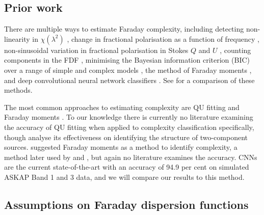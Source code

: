   \subsection{Prior work}
  \label{sec:faraday-prior-work}

      There are multiple ways to estimate Faraday complexity, including detecting non-\linebreak{}linearity in $\chi(\lambda^2)$ \citep{goldstein84faraday}, change in fractional polarisation as a function of frequency \citep{farnes14broadband}, non-sinusoidal variation in fractional polarisation in Stokes $Q$ and $U$ \citep{osullivan12agn}, counting components in the FDF \citep{law11faraday}, minimising the Bayesian information criterion (BIC) over a range of simple and complex models \citep[called ;][]{osullivan_broad-band_2017}, the method of Faraday moments \citep{anderson_broadband_2015,brown11report}, and deep convolutional neural network classifiers \citep[CNNs;][]{brown_classifying_2018}. See \citet{sun15comparison} for a comparison of these methods.

      The most common approaches to estimating complexity are QU fitting \linebreak\citep[e.g.][]{osullivan_broad-band_2017} and Faraday moments \citep[e.g.][]{anderson_broadband_2015}. To our knowledge there is currently no literature examining the accuracy of QU fitting when applied to complexity classification specifically, though \citet{miyashita19qu} analyse its effectiveness on identifying the structure of two-component sources. \citet{brown11report} suggested Faraday moments as a method to identify complexity, a method later used by \citet{farnes14broadband} and \citet{anderson_broadband_2015}, but again no literature examines the accuracy. CNNs are the current state-of-the-art with an accuracy of 94.9 per cent \citep{brown_classifying_2018} on simulated ASKAP Band 1 and 3 data, and we will compare our results to this method.

  \subsection{Assumptions on Faraday dispersion functions}
  \label{sec:faraday-fdfs}


